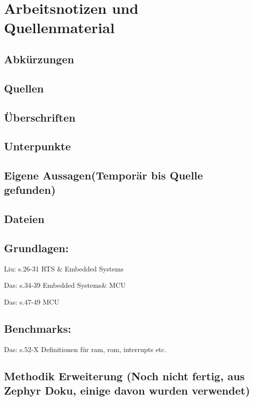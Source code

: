
\chapter{Arbeitsnotizen und Quellenmaterial}
\label{ch:notizen}

\section{Abk{\"u}rzungen}

\section{Quellen}

\section{{\"U}berschriften}

\section{Unterpunkte}

\section{Eigene Aussagen(Tempor{\"a}r bis Quelle gefunden)}

\section{Dateien}

\section{Grundlagen:}

Liu: s.26-31 RTS \& Embedded Systems

Das: s.34-39 Embedded Systems\& MCU

Das: s.47-49 MCU

\section{Benchmarks:}

Das: s.52-X Definitionen f{\"u}r ram, rom, interrupts etc.

\section{Methodik Erweiterung (Noch nicht fertig, aus Zephyr Doku, einige davon wurden verwendet)}


